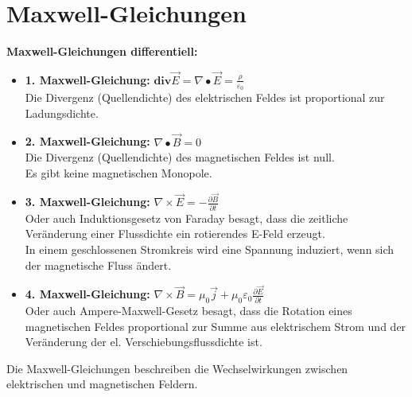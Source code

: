 \documentclass[german]{latex4ei/latex4ei_sheet}
\begin{document}
\section{Maxwell-Gleichungen}
\begin{sectionbox}
    \textbf{Maxwell-Gleichungen differentiell:}\\
    \begin{itemize}
        \item \textbf{1. Maxwell-Gleichung:} $\mathbf{div}\vec{E} = \nabla \bullet \vec{E} = \frac{\rho}{\varepsilon_0}$\\
              Die Divergenz (Quellendichte) des elektrischen Feldes ist proportional zur Ladungsdichte.\\  
        \item \textbf{2. Maxwell-Gleichung:} $\nabla \bullet \vec{B} = 0$\\
                Die Divergenz (Quellendichte) des magnetischen Feldes ist null.\\
                Es gibt keine magnetischen Monopole.\\
        \item \textbf{3. Maxwell-Gleichung:} $\nabla \times \vec{E} = -\frac{\partial \vec{B}}{\partial t}$ \vspace{1mm}\\
              Oder auch Induktionsgesetz von Faraday besagt, dass die zeitliche Veränderung einer Flussdichte ein rotierendes E-Feld erzeugt.\\
              In einem geschlossenen Stromkreis wird eine Spannung induziert, wenn sich der magnetische Fluss ändert.\\
        \item \textbf{4. Maxwell-Gleichung:} $\nabla \times \vec{B} = \mu_0\vec{j} + \mu_0\varepsilon_0\frac{\partial \vec{E}}{\partial t}$\vspace{1mm}\\
                Oder auch Ampere-Maxwell-Gesetz besagt, dass die Rotation eines magnetischen Feldes proportional zur Summe aus elektrischem Strom und der Veränderung der el. Verschiebungsflussdichte ist.\\
    \end{itemize}
    Die Maxwell-Gleichungen beschreiben die Wechselwirkungen zwischen elektrischen und magnetischen Feldern.\\


\end{sectionbox}
\end{document}
